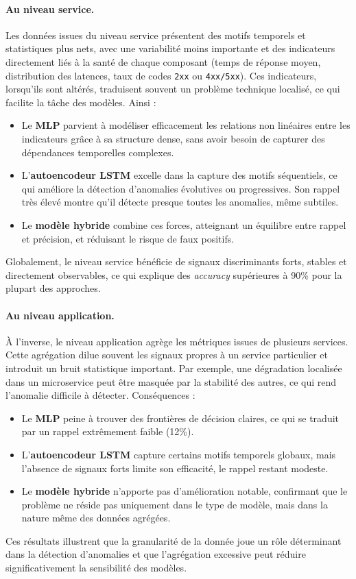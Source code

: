 \documentclass[a4paper,12pt]{report}
\begin{document}
\paragraph{Au niveau service.}
Les données issues du niveau service présentent des motifs temporels et statistiques plus nets, avec une variabilité moins importante et des indicateurs directement liés à la santé de chaque composant (temps de réponse moyen, distribution des latences, taux de codes \texttt{2xx} ou \texttt{4xx/5xx}).  
Ces indicateurs, lorsqu’ils sont altérés, traduisent souvent un problème technique localisé, ce qui facilite la tâche des modèles.  
Ainsi :
\begin{itemize}
    \item Le \textbf{MLP} parvient à modéliser efficacement les relations non linéaires entre les indicateurs grâce à sa structure dense, sans avoir besoin de capturer des dépendances temporelles complexes.
    \item L’\textbf{autoencodeur LSTM} excelle dans la capture des motifs séquentiels, ce qui améliore la détection d’anomalies évolutives ou progressives. Son rappel très élevé montre qu’il détecte presque toutes les anomalies, même subtiles.
    \item Le \textbf{modèle hybride} combine ces forces, atteignant un équilibre entre rappel et précision, et réduisant le risque de faux positifs.
\end{itemize}
Globalement, le niveau service bénéficie de signaux discriminants forts, stables et directement observables, ce qui explique des \textit{accuracy} supérieures à 90\% pour la plupart des approches.

\paragraph{Au niveau application.}
À l’inverse, le niveau application agrège les métriques issues de plusieurs services. Cette agrégation dilue souvent les signaux propres à un service particulier et introduit un bruit statistique important. Par exemple, une dégradation localisée dans un microservice peut être masquée par la stabilité des autres, ce qui rend l’anomalie difficile à détecter.  
Conséquences :
\begin{itemize}
    \item Le \textbf{MLP} peine à trouver des frontières de décision claires, ce qui se traduit par un rappel extrêmement faible (12\%).
    \item L’\textbf{autoencodeur LSTM} capture certains motifs temporels globaux, mais l’absence de signaux forts limite son efficacité, le rappel restant modeste.
    \item Le \textbf{modèle hybride} n’apporte pas d’amélioration notable, confirmant que le problème ne réside pas uniquement dans le type de modèle, mais dans la nature même des données agrégées.
\end{itemize}
Ces résultats illustrent que la granularité de la donnée joue un rôle déterminant dans la détection d’anomalies et que l’agrégation excessive peut réduire significativement la sensibilité des modèles.
\end{document}
